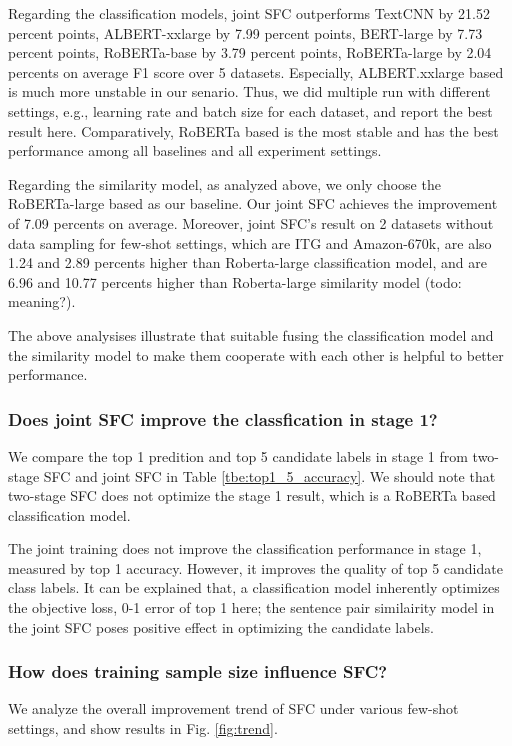 \documentclass[letterpaper]{article} %
\begin{document}
  Regarding the  classification  models,  joint SFC
  outperforms    TextCNN    by   21.52   percent points,   ALBERT-xxlarge   by   7.99
  percent points, BERT-large  by  7.73 percent points, RoBERTa-base by 3.79 
  percent points, RoBERTa-large by 2.04 percents on average F1 score over 5 datasets.  
  Especially, ALBERT.xxlarge based is much more  unstable  in our senario. Thus, 
  we did multiple run with different settings, e.g.,  learning rate and batch size 
  for each dataset, and  report the  best  result  here. Comparatively,  
  RoBERTa  based is  the  most stable and has the best performance among
  all baselines and all experiment settings.

  Regarding  the  similarity  model,  as  analyzed  above,  we  only  choose the
  RoBERTa-large based as our baseline. Our joint SFC achieves the improvement of
  7.09  percents  on average. Moreover, joint SFC's result on 2 datasets without
  data  sampling  for few-shot settings, which are ITG and Amazon-670k, are also
  1.24 and 2.89 percents higher than Roberta-large classification model, and are
  6.96 and 10.77 percents higher than Roberta-large similarity model (todo:
  meaning?).

  The above analysises illustrate that suitable fusing the classification model and the 
  similarity model to make them cooperate with each other is helpful to better
  performance.  

  \subsubsection*{Does joint SFC improve the classfication in stage 1?}
  We  compare  the  top  1  predition and top 5 candidate labels in stage 1 from
  two-stage SFC and joint SFC in Table \ref{tbe:top1_5_accuracy}. We should note
  that  two-stage  SFC  does not optimize the stage 1 result, which is a RoBERTa
  based classification model.

  The joint training does not improve the classification performance in stage 1,
  measured  by  top  1  accuracy.  However,  it  improves  the  quality of top 5
  candidate  class  labels.  It  can  be  explained that, a classification model
  inherently optimizes the objective loss, 0-1 error of top 1 here; the sentence
  pair similairity model in the joint SFC poses positive effect in optimizing the 
  candidate labels.


  \subsubsection*{How does training sample size influence SFC?} 
  We analyze the overall  improvement  trend  of  SFC under various few-shot
  settings, and show results in Fig. \ref{fig:trend}.
\end{document}
